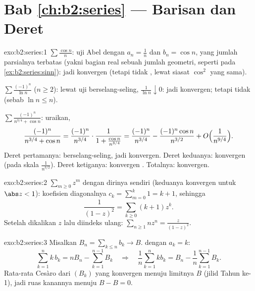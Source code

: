 \section*{Bab \ref{ch:b2:series} --- Barisan dan Deret}

\begin{solution}{exo:b2:series:1}
$\sum\frac{\cos n}{n}$: uji Abel dengan $a_n = \frac1n$ dan $b_n =
\cos n$, yang jumlah parsialnya terbatas (yakni bagian real sebuah
jumlah geometri, seperti pada \cref{ex:b2:series:sinn}): jadi konvergen
(tetapi tidak , lewat siasat $\cos^2$ yang sama).

$\sum \frac{(-1)^n}{\ln n}$ ($n \geq 2$): lewat uji berselang-seling,
$\frac{1}{\ln n} \downarrow 0$: jadi konvergen; tetapi tidak 
(sebab $\ln n \leq n$).

$\sum \frac{(-1)^n}{n^{3/4} + \cos n}$: uraikan,
\[
\frac{(-1)^n}{n^{3/4} + \cos n}
= \frac{(-1)^n}{n^{3/4}}\cdot
\frac{1}{1 + \frac{\cos n}{n^{3/4}}}
= \frac{(-1)^n}{n^{3/4}}
- \frac{(-1)^n\cos n}{n^{3/2}} + O\Bigl(\frac{1}{n^{9/4}}\Bigr).
\]
Deret pertamanya: berselang-seling, jadi konvergen. Deret keduanya:
konvergen  (pada skala $\frac{1}{n^{3/2}}$). Deret ketiganya:
konvergen . Totalnya: konvergen.
\end{solution}

\begin{solution}{exo:b2:series:2}
 $\sum_{m\geq0} z^m$ dengan dirinya sendiri (keduanya
konvergen  untuk $\abs z < 1$): koefisien diagonalnya $c_k =
\sum_{m=0}^{k} 1 = k + 1$, sehingga
\[
\frac{1}{(1-z)^2} = \sum_{k\geq0} (k+1)z^k .
\]
Setelah dikalikan $z$ lalu diindeks ulang: $\sum_{n \geq 1} n z^n =
\frac{z}{(1-z)^2}$.
\end{solution}

\begin{solution}{exo:b2:series:3}
Misalkan $B_n = \sum_{k \leq n} b_k \to B$.  dengan $a_k = k$:
\[
\sum_{k=1}^{n} k\,b_k = n B_n - \sum_{k=1}^{n-1} B_k
\quad\Longrightarrow\quad
\frac1n \sum_{k=1}^{n} k b_k = B_n - \frac{1}{n}\sum_{k=1}^{n-1}
B_k .
\]
Rata-rata Cesàro dari $(B_k)$ yang konvergen menuju limitnya $B$
(jilid Tahun ke-1), jadi ruas kanannya menuju $B - B = 0$.
\end{solution}


